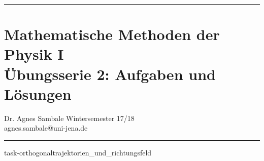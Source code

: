 \documentclass[a4paper,fleqn, 10pt]{article}
\begin{document}
	\pagestyle{empty}

	\hrule
	\section*{\centering Mathematische Methoden der Physik I \\ Übungsserie 2: Aufgaben und Lösungen}
	\medskip
	Dr. Agnes Sambale \hfill Wintersemester 17/18\\
	agnes.sambale@uni-jena.de
	\bigskip
	\hrule
	\bigskip
	\bigskip


	{task-orthogonaltrajektorien_und_richtungsfeld}
	\newpage
	
	\newpage
	

	\newpage






\end{document}
